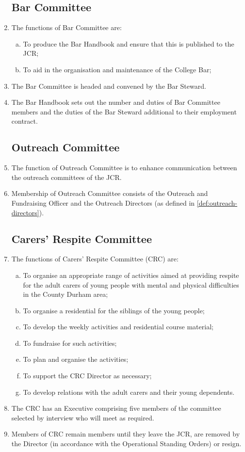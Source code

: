 \documentclass[12pt]{article}
\begin{document}
\begin{enumerate}
    \subsection{Bar Committee}
    \item The functions of Bar Committee are:
    \begin{enumerate}[(a)]
        \item To produce the Bar Handbook and ensure that this is published to the JCR;
        \item To aid in the organisation and maintenance of the College Bar;
    \end{enumerate}
    \item The Bar Committee is headed and convened by the Bar Steward.
    \item The Bar Handbook sets out the number and duties of Bar Committee members and the duties of the Bar Steward additional to their employment contract.
    \subsection{Outreach Committee}
    \item The function of Outreach Committee is to enhance communication between the outreach committees of the JCR.
    \item Membership of Outreach Committee consists of the Outreach and Fundraising Officer and the Outreach Directors (as defined in \ref{def:outreach-directors}).
    \subsection{Carers’ Respite Committee}
    \item The functions of Carers’ Respite Committee (CRC) are:
    \begin{enumerate}[(a)]
        \item To organise an appropriate range of activities aimed at providing respite for the adult carers of young people with mental and physical difficulties in the County Durham area;
        \item To organise a residential for the siblings of the young people;
        \item To develop the weekly activities and residential course material;
        \item To fundraise for such activities;
        \item To plan and organise the activities;
        \item To support the CRC Director as necessary;
        \item To develop relations with the adult carers and their young dependents.
    \end{enumerate}
    \item The CRC has an Executive comprising five members of the committee selected by interview who will meet as required.
    \item Members of CRC remain members until they leave the JCR, are removed by the Director (in accordance with the Operational Standing Orders) or resign.

\end{enumerate}
\end{document}
